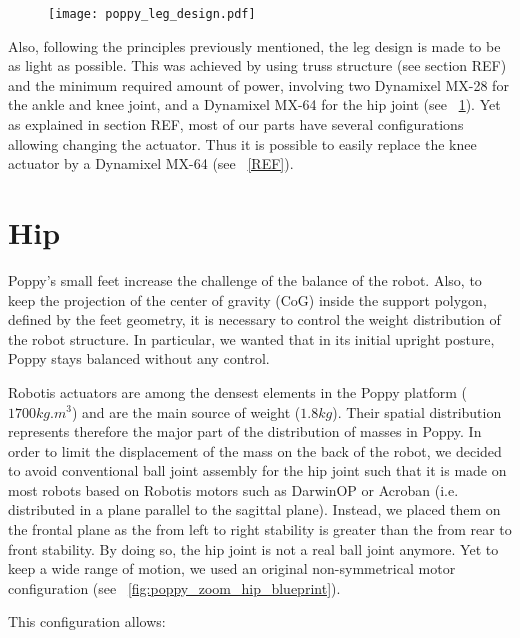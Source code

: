 \begin{figure}[p]
    \begin{center}
        \texttt{[image: poppy\_leg\_design.pdf]}
    \end{center}
    \caption{}
    \label{fig:poppy_leg_design}
\end{figure}


Also, following the principles previously mentioned, the leg design is made to be as light as possible. This was achieved by using truss structure (see section REF) and the minimum required amount of power, involving two Dynamixel MX-28 for the ankle and knee joint, and a Dynamixel MX-64 for the hip joint (see \figurename~\ref{fig:poppy_leg_design}). Yet as explained in section REF, most of our parts have several configurations allowing changing the actuator. Thus it is possible to easily replace the knee actuator by a Dynamixel MX-64 (see \figurename~\ref{REF}).



\section{Hip} %
\label{sec:hip}


Poppy's small feet increase the challenge of the balance of the robot. Also, to keep the projection of the center of gravity (CoG) inside the support polygon, defined by the feet geometry, it is necessary to control the weight distribution of the robot structure. In particular, we wanted that in its initial upright posture, Poppy stays balanced without any control.

Robotis actuators are among the densest elements in the Poppy platform ($ 1700 kg.m^{3} $) and are the main source of weight ($1.8 kg$). Their spatial distribution represents therefore the major part of the distribution of masses in Poppy. In order to limit the displacement of the mass on the back of the robot, we decided to avoid conventional ball joint assembly for the hip joint such that it is made on most robots based on Robotis motors such as DarwinOP or Acroban (i.e. distributed in a plane parallel to the sagittal plane). Instead, we placed them on the frontal plane as the from left to right stability is greater than the from rear to front stability. By doing so, the hip joint is not a real ball joint anymore. Yet to keep a wide range of motion, we used an original non-symmetrical motor configuration (see \figurename~\ref{fig:poppy_zoom_hip_blueprint}).

This configuration allows:

